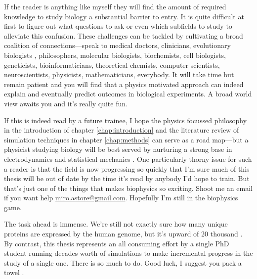 If the reader is anything like myself they will find the amount of required knowledge to study biology a substantial barrier to entry. It is quite difficult at first to figure out what questions to ask or even which subfields to study to alleviate this confusion. These challenges can be tackled by cultivating a broad coalition of connections---speak to medical doctors, clinicians, evolutionary biologists \cite{dawkins1989, dawkins2016}, philosophers, molecular biologists, biochemists, cell biologists\cite{pollard2016}, geneticists, bioinformaticians, theoretical chemists, computer scientists, neuroscientists, physicists, mathematicians, everybody. It will take time but remain patient and you will find that a physics motivated approach can indeed explain and eventually predict outcomes in biological experiments. A broad world view awaits you and it's really quite fun. 

If this is indeed read by a future trainee, I hope the physics focussed philosophy in the introduction of chapter \ref{chap:introduction} and the literature review of simulation techniques in chapter \ref{chap:methods} can serve as a road map---but a physicist studying biology will be best served by nurturing a strong base in electrodynamics and statistical mechanics \cite{griffiths2017, reif2009, zuckerman2010}. One particularly thorny issue for such a reader is that the field is now progressing so quickly that I'm sure much of this thesis will be out of date by the time it's read by anybody I'd hope to train. But that's just one of the things that makes biophysics so exciting. Shoot me an email if you want help \href{mailto:miro.astore@gmailcom}{miro.astore@gmail.com}. Hopefully I'm still in the biophysics game.

The task ahead is immense. We're still not exactly sure how many unique proteins are expressed by the human genome, but it's upward of 20 thousand \cite{salzberg2018}. By contrast, this thesis represents an all consuming effort by a single PhD student running decades worth of simulations to make incremental progress in the study of a single one. There is so much to do. Good luck, I suggest you pack a towel \cite{adams1979}. 

